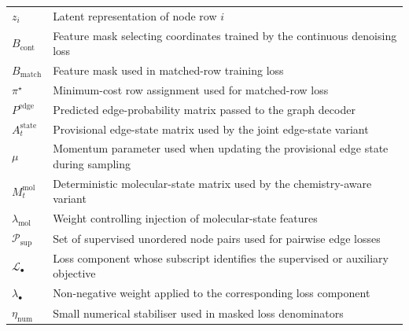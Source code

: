 \begin{tabularx}{\textwidth}{@{}L X@{}}
$z_i$ & Latent representation of node row $i$ \\
$B_{\mathrm{cont}}$ & Feature mask selecting coordinates trained by the continuous denoising loss \\
$B_{\mathrm{match}}$ & Feature mask used in matched-row training loss \\
$\pi^\star$ & Minimum-cost row assignment used for matched-row loss \\
$P^{\mathrm{edge}}$ & Predicted edge-probability matrix passed to the graph decoder \\
$A_t^{\mathrm{state}}$ & Provisional edge-state matrix used by the joint edge-state variant \\
$\mu$ & Momentum parameter used when updating the provisional edge state during sampling \\
$M_t^{\mathrm{mol}}$ & Deterministic molecular-state matrix used by the chemistry-aware variant \\
$\lambda_{\mathrm{mol}}$ & Weight controlling injection of molecular-state features \\
$\mathcal{P}_{\mathrm{sup}}$ & Set of supervised unordered node pairs used for pairwise edge losses \\
$\mathcal{L}_{\bullet}$ & Loss component whose subscript identifies the supervised or auxiliary objective \\
$\lambda_{\bullet}$ & Non-negative weight applied to the corresponding loss component \\
$\eta_{\mathrm{num}}$ & Small numerical stabiliser used in masked loss denominators \\


\end{tabularx}

